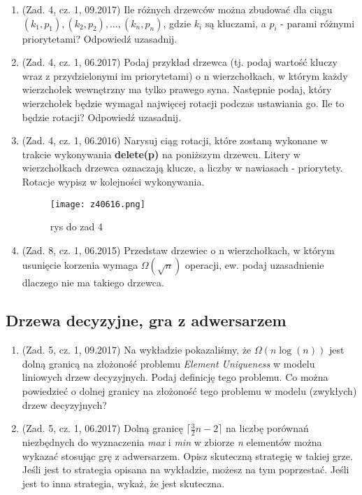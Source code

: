 \documentclass[10pt]{article}%
\begin{document}
\begin{enumerate}

\item(Zad. 4, cz. 1, 09.2017) Ile różnych drzewców można zbudować dla ciągu $(k_1,p_1),(k_2,p_2),\ldots,(k_n, p_n)$, gdzie $k_i$ są kluczami, a $p_i$ - parami różnymi priorytetami? Odpowiedź uzasadnij.

\item(Zad. 4, cz. 1, 06.2017) Podaj przykład drzewca (tj. podaj wartość kluczy wraz z przydzielonymi im priorytetami) o n wierzchołkach, w którym każdy wierzchołek wewnętrzny ma tylko prawego syna. Następnie podaj, który wierzchołek będzie wymagał najwięcej rotacji podczas ustawiania go. Ile to będzie rotacji? Odpowiedź uzasadnij.

\item (Zad. 4, cz. 1, 06.2016) Narysuj ciąg rotacji, które zostaną wykonane w trakcie wykonywania \textbf{delete(p)} na poniższym drzewcu. Litery w wierzchołkach drzewca oznaczają klucze, a liczby w nawiasach - priorytety. Rotacje wypisz w kolejności wykonywania.
\begin{figure}[H]
	\begin{center}
		\texttt{[image: z40616.png]}
	\end{center}
	\caption{rys do zad 4}
\end{figure}

\item (Zad. 8, cz. 1, 06.2015) Przedstaw drzewiec o n wierzchołkach, w którym usunięcie korzenia wymaga $\Omega(\sqrt{n})$ operacji, ew. podaj uzasadnienie dlaczego nie ma takiego drzewca.


\end{enumerate}


\subsection{Drzewa decyzyjne, gra z adwersarzem}

\begin{enumerate}

\item (Zad. 5, cz. 1, 09.2017) Na wykładzie pokazaliśmy, że $\Omega(n \log(n))$ jest dolną granicą na złożoność problemu \textit{Element Uniqueness} w modelu liniowych drzew decyzyjnych. Podaj definicję tego problemu. Co można powiedzieć o dolnej granicy na złożoność tego problemu w modelu (zwykłych) drzew decyzyjnych?

\item (Zad. 5, cz. 1, 06.2017) Dolną granicę $\lceil \frac{3}{2} n - 2 \rceil $ na liczbę porównań niezbędnych do wyznaczenia \emph{max} i \emph{min} w zbiorze \emph{n} elementów można wykazać stosując grę z adwersarzem. Opisz skuteczną strategię w takiej grze. Jeśli jest to strategia opisana na wykładzie, możesz na tym poprzestać. Jeśli jest to inna strategia, wykaż, że jest skuteczna.

\end{enumerate}
\end{document}
